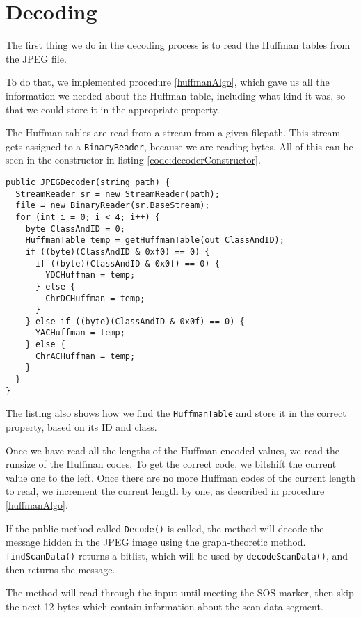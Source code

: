 \section{Decoding}
The first thing we do in the decoding process is to read the Huffman tables from the JPEG file. 

To do that, we implemented procedure \ref{huffmanAlgo}, which gave us all the information we needed about the Huffman table, including what kind it was, so that we could store it in the appropriate property. 

The Huffman tables are read from a stream from a given filepath.
This stream gets assigned to a \lstinline|BinaryReader|, because we are reading bytes.
All of this can be seen in the constructor in listing \ref{code:decoderConstructor}.

\begin{lstlisting}[firstnumber=36, label={code:decoderConstructor}, caption={The Decoder constructor \textbf{File: }JPEGDecoder.cs}]
public JPEGDecoder(string path) {
  StreamReader sr = new StreamReader(path);
  file = new BinaryReader(sr.BaseStream);
  for (int i = 0; i < 4; i++) {
    byte ClassAndID = 0;
    HuffmanTable temp = getHuffmanTable(out ClassAndID);
    if ((byte)(ClassAndID & 0xf0) == 0) {
      if ((byte)(ClassAndID & 0x0f) == 0) {
        YDCHuffman = temp;
      } else {
        ChrDCHuffman = temp;
      }
    } else if ((byte)(ClassAndID & 0x0f) == 0) {
      YACHuffman = temp;
    } else {
      ChrACHuffman = temp;
    }
  }
}
\end{lstlisting} 

The listing also shows how we find the \lstinline{HuffmanTable} and store it in the correct property, based on its ID and class.

Once we have read all the lengths of the Huffman encoded values, we read the runsize of the Huffman codes.
To get the correct code, we bitshift the current value one to the left. 
Once there are no more Huffman codes of the current length to read, we increment the current length by one, as described in procedure \ref{huffmanAlgo}.

If the public method called \lstinline|Decode()| is called, the method will decode the message hidden in the JPEG image using the graph-theoretic method.
\lstinline|findScanData()| returns a bitlist, which will be used by \lstinline|decodeScanData()|, and then returns the message.

The method will read through the input until meeting the SOS marker, then skip the next 12 bytes which contain information about the scan data segment.


